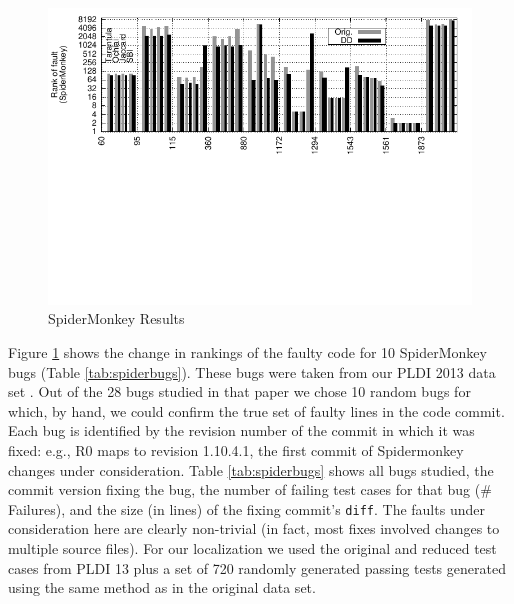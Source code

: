 \begin{figure}[t]
  \centering
  \includegraphics[width=2\columnwidth]{naspidermonkey}
 \vspace{-2.2in}
  \caption{SpiderMonkey Results}
  \label{fig:spidermonkey}

\end{figure}

Figure \ref{fig:spidermonkey} shows the change in rankings of the
faulty code for 10 SpiderMonkey bugs (Table \ref{tab:spiderbugs}).
These bugs were taken from our PLDI 2013 data set \cite{PLDI13}.  Out
of the 28 bugs studied in that paper we chose 10 random bugs for which, by
hand, we could confirm the true set of faulty lines in the code
commit.  Each bug is identified by the revision number of the commit
in which it was fixed: e.g., R0 maps to revision 1.10.4.1, the first
commit of Spidermonkey changes under consideration. Table
\ref{tab:spiderbugs} shows all bugs studied, the commit version fixing
the bug, the number of failing test cases for that bug (\# Failures),
and the size (in lines) of the fixing commit's {\tt diff}.  The faults
under consideration here are clearly non-trivial (in fact, most fixes
involved changes to multiple source files).  For our localization we
used the original and reduced test cases from PLDI 13 \cite{PLDI13}
plus a set of 720 randomly generated passing tests generated using the same method as in
the original data set.

